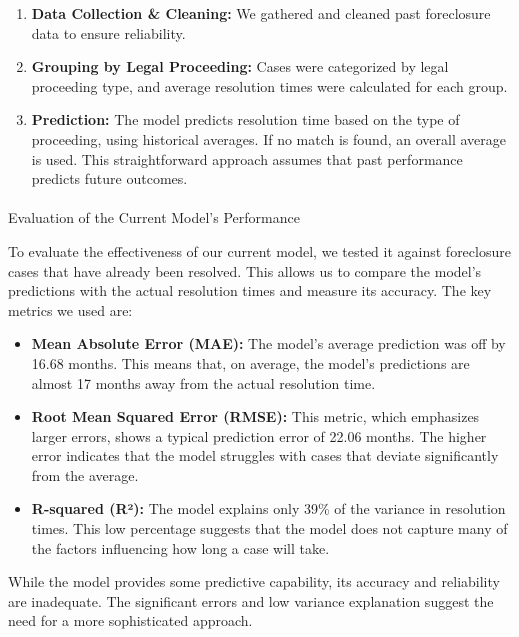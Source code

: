 \documentclass[
  letterpaper,
  DIV=11,
  numbers=noendperiod]{scrartcl}
\makeatletter
\let\oldparagraph\paragraph
\renewcommand{\paragraph}{
    \@ifstar
      \xxxParagraphStar
      \xxxParagraphNoStar
  }
\newcommand{\xxxParagraphStar}[1]{\oldparagraph*{#1}\mbox{}}
\newcommand{\xxxParagraphNoStar}[1]{\oldparagraph{#1}\mbox{}}
\makeatother
\begin{document}
\begin{enumerate}
\def\labelenumi{\arabic{enumi}.}
\item
  \textbf{Data Collection \& Cleaning:} We gathered and cleaned past
  foreclosure data to ensure reliability.
\item
  \textbf{Grouping by Legal Proceeding:} Cases were categorized by legal
  proceeding type, and average resolution times were calculated for each
  group.
\item
  \textbf{Prediction:} The model predicts resolution time based on the
  type of proceeding, using historical averages. If no match is found,
  an overall average is used. This straightforward approach assumes that
  past performance predicts future outcomes.
\end{enumerate}

\paragraph{Evaluation of the Current Model's
Performance}\label{evaluation-of-the-current-models-performance}

To evaluate the effectiveness of our current model, we tested it against
foreclosure cases that have already been resolved. This allows us to
compare the model's predictions with the actual resolution times and
measure its accuracy. The key metrics we used are:

\begin{itemize}
\item
  \textbf{Mean Absolute Error (MAE):} The model's average prediction was
  off by 16.68 months. This means that, on average, the model's
  predictions are almost 17 months away from the actual resolution time.
\item
  \textbf{Root Mean Squared Error (RMSE):} This metric, which emphasizes
  larger errors, shows a typical prediction error of 22.06 months. The
  higher error indicates that the model struggles with cases that
  deviate significantly from the average.
\item
  \textbf{R-squared (R²):} The model explains only 39\% of the variance
  in resolution times. This low percentage suggests that the model does
  not capture many of the factors influencing how long a case will take.
\end{itemize}

While the model provides some predictive capability, its accuracy and
reliability are inadequate. The significant errors and low variance
explanation suggest the need for a more sophisticated approach.
\end{document}
